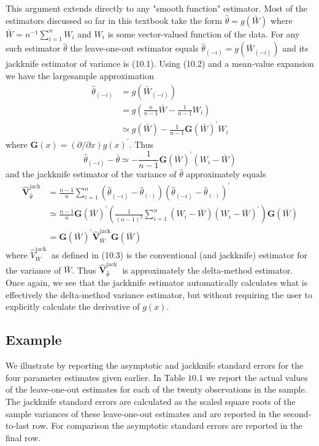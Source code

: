 \documentclass[10pt]{article}
\begin{document}
This argument extends directly to any "smooth function" estimator. Most of the estimators discussed so far in this textbook take the form $\widehat{\theta}=g(\bar{W})$ where $\bar{W}=n^{-1} \sum_{i=1}^{n} W_{i}$ and $W_{i}$ is some vector-valued function of the data. For any such estimator $\widehat{\theta}$ the leave-one-out estimator equals $\widehat{\theta}_{(-i)}=g\left(\bar{W}_{(-i)}\right)$ and its jackknife estimator of variance is (10.1). Using (10.2) and a mean-value expansion we have the largesample approximation
$$
\begin{aligned}
\widehat{\theta}_{(-i)} &=g\left(\bar{W}_{(-i)}\right) \\
&=g\left(\frac{n}{n-1} \bar{W}-\frac{1}{n-1} W_{i}\right) \\
& \simeq g(\bar{W})-\frac{1}{n-1} \boldsymbol{G}(\bar{W})^{\prime} W_{i}
\end{aligned}
$$
where $\boldsymbol{G}(x)=(\partial / \partial x) g(x)^{\prime}$. Thus
$$
\widehat{\theta}_{(-i)}-\bar{\theta} \simeq-\frac{1}{n-1} \boldsymbol{G}(\bar{W})^{\prime}\left(W_{i}-\bar{W}\right)
$$
and the jackknife estimator of the variance of $\widehat{\theta}$ approximately equals
$$
\begin{aligned}
\widehat{\boldsymbol{V}}_{\widehat{\theta}}^{\mathrm{jack}} &=\frac{n-1}{n} \sum_{i=1}^{n}\left(\widehat{\theta}_{(-i)}-\widehat{\theta}_{(\cdot)}\right)\left(\widehat{\theta}_{(-i)}-\widehat{\theta}_{(\cdot)}\right)^{\prime} \\
& \simeq \frac{n-1}{n} \boldsymbol{G}(\bar{W})^{\prime}\left(\frac{1}{(n-1)^{2}} \sum_{i=1}^{n}\left(W_{i}-\bar{W}\right)\left(W_{i}-\bar{W}\right)^{\prime}\right) \boldsymbol{G}(\bar{W}) \\
&=\boldsymbol{G}(\bar{W})^{\prime} \widehat{\boldsymbol{V}}_{\bar{W}}^{\mathrm{jack}} \boldsymbol{G}(\bar{W})
\end{aligned}
$$
where $\widehat{V}_{\bar{W}}^{\text {jack }}$ as defined in (10.3) is the conventional (and jackknife) estimator for the variance of $\bar{W}$. Thus $\widehat{\boldsymbol{V}}_{\widehat{\theta}}^{\text {jack }}$ is approximately the delta-method estimator. Once again, we see that the jackknife estimator automatically calculates what is effectively the delta-method variance estimator, but without requiring the user to explicitly calculate the derivative of $g(x)$.

\subsection{Example}
We illustrate by reporting the asymptotic and jackknife standard errors for the four parameter estimates given earlier. In Table $10.1$ we report the actual values of the leave-one-out estimates for each of the twenty observations in the sample. The jackknife standard errors are calculated as the scaled square roots of the sample variances of these leave-one-out estimates and are reported in the second-to-last row. For comparison the asymptotic standard errors are reported in the final row.
\end{document}

